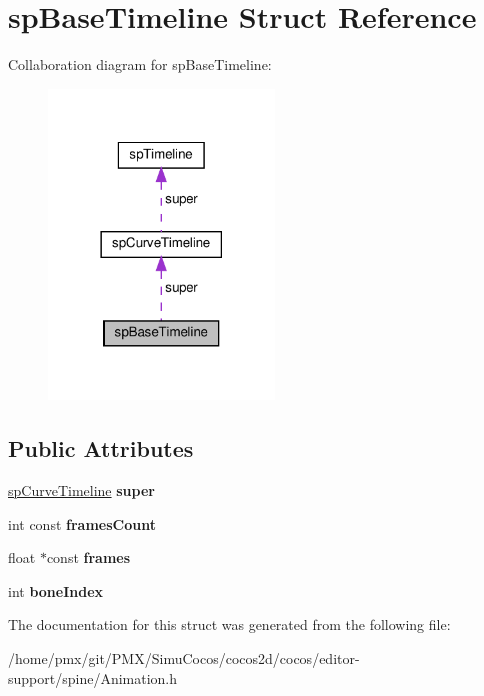 \hypertarget{structspBaseTimeline}{}\section{sp\+Base\+Timeline Struct Reference}
\label{structspBaseTimeline}


Collaboration diagram for sp\+Base\+Timeline\+:
\nopagebreak
\begin{figure}[H]
\begin{center}
\leavevmode
\includegraphics[width=170pt]{structspBaseTimeline__coll__graph}
\end{center}
\end{figure}
\subsection*{Public Attributes}
\begin{DoxyCompactItemize}
\item 
\mbox{\label{structspBaseTimeline_ae676f6a7c40a938477f742df3ca50d45}} 
\hyperlink{structspCurveTimeline}{sp\+Curve\+Timeline} {\bfseries super}
\item 
\mbox{\label{structspBaseTimeline_a89f55c9198c6c4af222e682d22c22ef8}} 
int const {\bfseries frames\+Count}
\item 
\mbox{\label{structspBaseTimeline_ab9b3622ac13a383cb71eeba9688d2c9f}} 
float $\ast$const {\bfseries frames}
\item 
\mbox{\label{structspBaseTimeline_afd672a36e424fca6759be4abdcc83ae1}} 
int {\bfseries bone\+Index}
\end{DoxyCompactItemize}


The documentation for this struct was generated from the following file\+:\begin{DoxyCompactItemize}
\item 
/home/pmx/git/\+P\+M\+X/\+Simu\+Cocos/cocos2d/cocos/editor-\/support/spine/Animation.\+h\end{DoxyCompactItemize}
